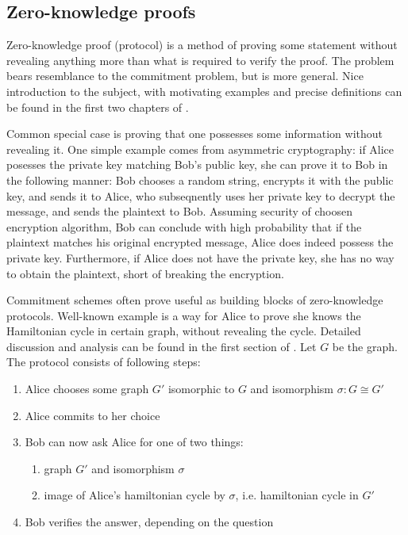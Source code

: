 \documentclass[10pt]{article}
\begin{document}
\subsection{Zero-knowledge proofs}

Zero-knowledge proof (protocol) is a method of proving some statement without revealing anything more
than what is required to verify the proof. The problem bears resemblance to the commitment problem, but
is more general. Nice introduction to the subject, with motivating examples and precise definitions can
be found in the first two chapters of \cite{MIT:StatZero}. 

Common special case is proving that one possesses some information without revealing it.
One simple example comes from asymmetric cryptography: if Alice posesses the private key matching Bob's
public key, she can prove it to Bob in the following manner: Bob chooses a random string, encrypts it
with the public key, and sends it to Alice, who subseqnently uses her private key to decrypt the message,
and sends the plaintext to Bob. Assuming security of choosen encryption algorithm, Bob can conclude 
with high probability that if the plaintext matches his original encrypted message, Alice does indeed
possess the private key. Furthermore, if Alice does not have the private key, she has no way to obtain
the plaintext, short of breaking the encryption.

Commitment schemes often prove useful as building blocks of zero-knowledge protocols. Well-known example
is a way for Alice to prove she knows the Hamiltonian cycle in certain graph, without revealing the
cycle. Detailed discussion and analysis can be found in the first section of \cite{CM:CryptoNotes}. 
Let \(G\) be the graph. The protocol consists of following steps:

\begin{enumerate}
  \item Alice chooses some graph \(G'\) isomorphic to \(G\) and isomorphism \(\sigma\colon G\cong G'\)
  \item Alice commits to her choice
  \item Bob can now ask Alice for one of two things:
    \begin{enumerate}
      \item graph \(G'\) and isomorphism \(\sigma\)
      \item image of Alice's hamiltonian cycle by \(\sigma\), i.e. hamiltonian cycle in \(G'\)
    \end{enumerate}
  \item Bob verifies the answer, depending on the question
\end{enumerate}
\end{document}
